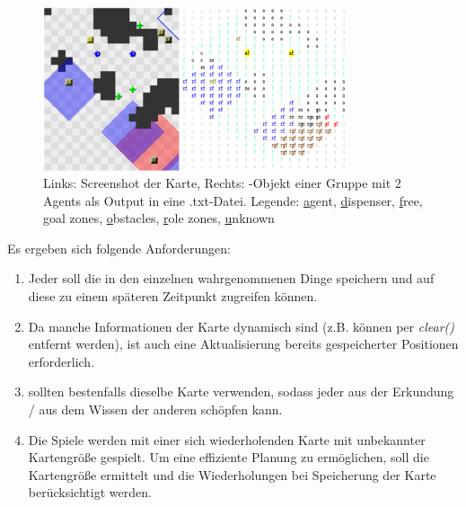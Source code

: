 \begin{figure}[h]
	\includegraphics[width=0.8\textwidth]{./Abbildungen/map.png}
	\centering
	\caption{Links: Screenshot der Karte, Rechts: \NextMap-Objekt einer Gruppe mit 2 Agents als Output in eine .txt-Datei. \newline Legende: \underline{a}gent, \underline{d}ispenser, \underline{f}ree, \underline{g}oal zones, \underline{o}bstacles, \underline{r}ole zones, \underline{u}nknown}
\end{figure} 

Es ergeben sich folgende Anforderungen:
\begin{enumerate}
	\item Jeder \Agent soll die in den einzelnen \Steps wahrgenommenen Dinge speichern und auf diese zu einem späteren Zeitpunkt zugreifen können. 
	\item Da manche Informationen der Karte dynamisch sind (z.B. können \Obstacles per \textit{clear()} entfernt werden), ist auch eine Aktualisierung bereits gespeicherter Positionen erforderlich. 
	\item \Agents sollten bestenfalls dieselbe Karte verwenden, sodass jeder \Agent aus der Erkundung / aus dem Wissen der anderen \Agents schöpfen kann.
	\item Die Spiele werden mit einer sich wiederholenden Karte mit unbekannter Kartengröße gespielt. Um eine effiziente Planung zu ermöglichen, soll die Kartengröße ermittelt und die Wiederholungen bei Speicherung der Karte berücksichtigt werden.
\end{enumerate}

